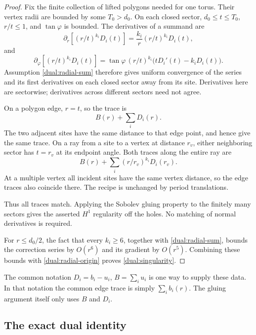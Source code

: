 \begin{proof}
Fix the finite collection of lifted polygons needed for one
torus. Their vertex radii are bounded by some \(T_0>d_0\). On each
closed sector, \(d_0\leq t\leq T_0\), \(r/t\leq1\), and
\(\tan\varphi\) is bounded.  The derivatives of a summand are
\[
 \partial_r\left[(r/t)^{k_i}D_i(t)\right]
       =\frac{k_i}{r}(r/t)^{k_i}D_i(t),
\]
and
\[
 \partial_\varphi\left[(r/t)^{k_i}D_i(t)\right]
       =\tan\varphi\,(r/t)^{k_i}
                         \bigl(tD_i'(t)-k_iD_i(t)\bigr).
\]
Assumption \eqref{dual:radial-sum} therefore gives uniform
convergence of the series and its first derivatives on each
closed sector away from its site.  Derivatives here are
sectorwise; derivatives across different sectors need not agree.

On a polygon edge, \(r=t\), so the trace is
\[
 B(r)+\sum_iD_i(r).
\]
The two adjacent sites have the same distance to that edge
point, and hence give the same trace.  On a ray from a site
to a vertex at distance \(r_v\), either neighboring sector has
\(t=r_v\) at its endpoint angle.  Both traces along the entire
ray are
\[
 B(r)+\sum_i(r/r_v)^{k_i}D_i(r_v).
\]
At a multiple vertex all incident sites have the same vertex
distance, so the edge traces also coincide there.  The recipe
is unchanged by period translations.

Thus all traces match.  Applying the Sobolev gluing property
to the finitely many sectors gives the asserted \(H^1\)
regularity off the holes.  No matching of normal derivatives
is required.

For \(r\leq d_0/2\), the fact that every \(k_i\geq6\), together
with \eqref{dual:radial-sum}, bounds the correction series by
\(O(r^6)\) and its gradient by \(O(r^5)\).  Combining these
bounds with \eqref{dual:radial-origin} proves
\eqref{dual:singularity}.
\end{proof}

The common notation \(D_i=b_i-u_i\), \(B=\sum_i u_i\) is one way
to supply these data.  In that notation the common edge trace
is simply \(\sum_i b_i(r)\).  The gluing argument itself only
uses \(B\) and \(D_i\).

\subsection{The exact dual identity}

